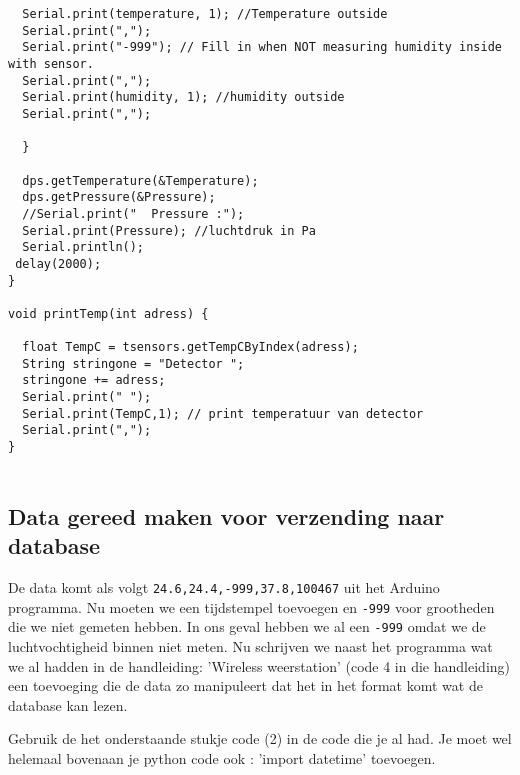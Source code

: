\begin{verbatim}
  Serial.print(temperature, 1); //Temperature outside
  Serial.print(",");
  Serial.print("-999"); // Fill in when NOT measuring humidity inside with sensor.
  Serial.print(",");
  Serial.print(humidity, 1); //humidity outside
  Serial.print(",");
  
  }
  
  dps.getTemperature(&Temperature);
  dps.getPressure(&Pressure);
  //Serial.print("  Pressure :");
  Serial.print(Pressure); //luchtdruk in Pa
  Serial.println();  
 delay(2000);
}

void printTemp(int adress) { 
  
  float TempC = tsensors.getTempCByIndex(adress);
  String stringone = "Detector ";
  stringone += adress;
  Serial.print(" ");
  Serial.print(TempC,1); // print temperatuur van detector
  Serial.print(",");
}
    
\end{verbatim}

\subsection{Data gereed maken voor verzending naar database}

De data komt als volgt \verb|24.6,24.4,-999,37.8,100467| uit het Arduino programma.
Nu moeten we een tijdstempel toevoegen en \verb|-999| voor grootheden die 
we niet gemeten hebben. In ons geval hebben we al een \verb|-999| omdat we de 
luchtvochtigheid binnen niet meten.
Nu schrijven we naast het programma wat we al hadden in de handleiding: 'Wireless
weerstation' (code 4 in die handleiding) een toevoeging die de data zo manipuleert dat het in het 
format komt wat de \hisparc database kan lezen.

Gebruik de het onderstaande stukje code (2) in de code die je al had.
Je moet wel helemaal bovenaan je python code ook : 'import datetime' toevoegen.

